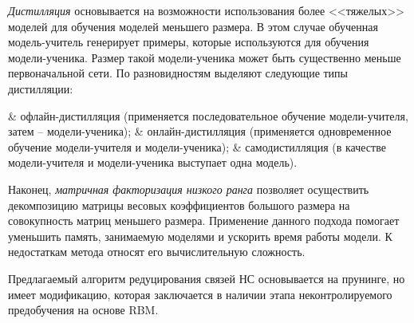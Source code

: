 \textit{Дистилляция} основывается на возможности использования более <<тяжелых>> моделей для обучения моделей меньшего размера. В этом случае обученная модель-учитель генерирует примеры, которые используются для обучения модели-ученика. Размер такой модели-ученика может быть существенно меньше первоначальной сети. По разновидностям выделяют следующие типы дистилляции:

\begin{easylist}
	& офлайн-дистилляция (применяется последовательное обучение модели-учителя, затем -- модели-ученика);
	& онлайн-дистилляция (применяется одновременное обучение модели-учителя и модели-ученика);
	& самодистилляция (в качестве модели-учителя и модели-ученика выступает одна модель).
\end{easylist}

Наконец, \textit{матричная факторизация низкого ранга} позволяет осуществить декомпозицию матрицы весовых коэффициентов большого размера на совокупность матриц меньшего размера. Применение данного подхода помогает уменьшить память, занимаемую моделями и ускорить время работы модели. К недостаткам метода относят его вычислительную сложность.

Предлагаемый алгоритм редуцирования связей НС основывается на прунинге, но имеет модификацию, которая заключается в наличии этапа неконтролируемого предобучения на основе RBM.

